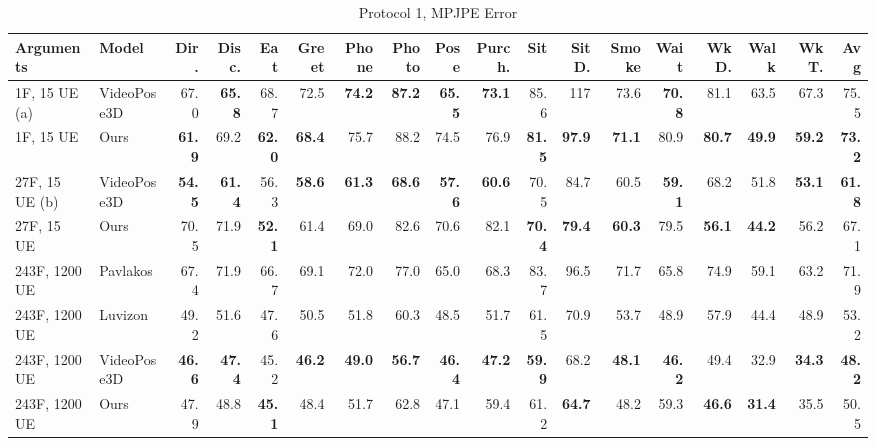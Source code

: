 \documentclass[10pt,twocolumn,letterpaper]{article}
\begin{document}
\begin{center}
\begin{table}
\small
\setlength\tabcolsep{2.3pt}
\begin{tabular}{l|l|rrrrrrrrrrrrrrrr}
Arguments & Model & Dir. & Disc. & Eat & Greet & Phone & Photo & Pose & Purch. & Sit & SitD. & Smoke & Wait & WkD. & Walk & WkT. & \textbf{Avg} \\

\hline
1F, 15 UE (a) & VideoPose3D & 67.0 & \textbf{65.8} & 68.7 & 72.5 & \textbf{74.2} & \textbf{87.2} & \textbf{65.5} & \textbf{73.1} & 85.6 & 117 & 73.6 & \textbf{70.8} & 81.1 & 63.5 & 67.3 & 75.5 \\
1F, 15 UE & Ours & \textbf{61.9} & 69.2 & \textbf{62.0} & \textbf{68.4} & 75.7 & 88.2 & 74.5 & 76.9 & \textbf{81.5} & \textbf{97.9} & \textbf{71.1} & 80.9 & \textbf{80.7} & \textbf{49.9} & \textbf{59.2} & \textbf{73.2}\\

\hline


27F, 15 UE (b) & VideoPose3D & \textbf{54.5} & \textbf{61.4} & 56.3 & \textbf{58.6} & \textbf{61.3} & \textbf{68.6} & \textbf{57.6} & \textbf{60.6} & 70.5 & 84.7 & 60.5 & \textbf{59.1} & 68.2 & 51.8 & \textbf{53.1} & \textbf{61.8} \\
27F, 15 UE & Ours & 70.5 & 71.9 & \textbf{52.1} & 61.4 & 69.0 & 82.6 & 70.6 & 82.1 & \textbf{70.4} & \textbf{79.4} & \textbf{60.3} & 79.5 & \textbf{56.1} & \textbf{44.2} & 56.2 & 67.1\\
\hline

243F, 1200 UE & Pavlakos \cite{pavlakos2017coarse} & 67.4 & 71.9 & 66.7 & 69.1 & 72.0 & 77.0 & 65.0 & 68.3 & 83.7 & 96.5 & 71.7 & 65.8 & 74.9 & 59.1 & 63.2 & 71.9 \\
243F, 1200 UE & Luvizon \cite{luvizon20182d} & 49.2 & 51.6 & 47.6 & 50.5 & 51.8 & 60.3 & 48.5 & 51.7 & 61.5 & 70.9 & 53.7 & 48.9 & 57.9 & 44.4 & 48.9 & 53.2\\
243F, 1200 UE & VideoPose3D & \textbf{46.6} & \textbf{47.4} & 45.2 & \textbf{46.2} & \textbf{49.0} & \textbf{56.7} & \textbf{46.4} & \textbf{47.2} & \textbf{59.9} & 68.2 & \textbf{48.1} & \textbf{46.2} & 49.4 & 32.9 & \textbf{34.3} & \textbf{48.2}\\
243F, 1200 UE & Ours & 47.9 & 48.8 & \textbf{45.1} & 48.4 & 51.7 & 62.8 & 47.1 & 59.4 & 61.2 & \textbf{64.7} & 48.2 & 59.3 & \textbf{46.6} & \textbf{31.4} & 35.5 & 50.5\\
 
\hline 

\hline
\end{tabular}

\caption{Protocol 1, MPJPE Error}
\label{tab:MPJPE Error}
\end{table}
\end{center}
\end{document}
